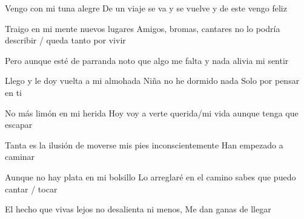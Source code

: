 \endverse

\beginverse
    Vengo con mi tuna alegre
    De un viaje se va y se vuelve
    y de este vengo feliz

    Traigo en mi mente nuevos lugares
    Amigos,  bromas,  cantares
    no lo podría describir / queda tanto por vivir
\endverse

\beginverse
    Pero aunque esté de parranda
    noto que algo me falta
    y nada alivia mi sentir
    
    Llego y le doy vuelta a mi almohada
    Niña no he dormido nada
    Solo por pensar en ti
\endverse

\beginverse
    No más limón en mi herida
    Hoy voy a verte querida/mi vida 
    aunque tenga que escapar
    
    Tanta es la ilusión de moverse
    mis pies inconscientemente
    Han empezado a caminar
\endverse

\beginverse
    Aunque no hay plata en mi bolsillo
    Lo arreglaré en el camino
    sabes que puedo cantar / tocar
    
    El hecho que vivas lejos
    no desalienta ni menos,
    Me dan ganas de llegar
\endverse
